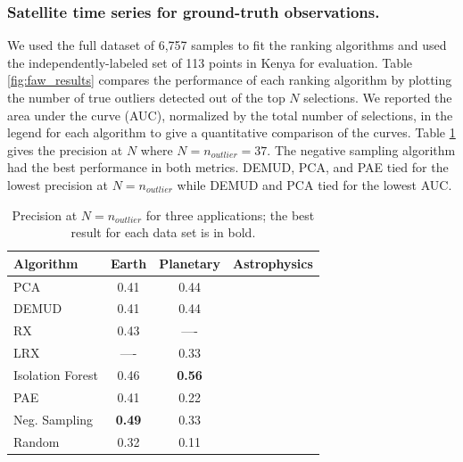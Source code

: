\documentclass[letterpaper]{article} %
\begin{document}
\subsubsection{Satellite time series for ground-truth observations.}
We used the full dataset of 6,757 samples to fit the ranking algorithms and
used the independently-labeled set of 113 points in Kenya for evaluation.
Table \ref{fig:faw_results} compares the performance of each ranking 
algorithm by plotting the number of true outliers detected out of the top
$N$ selections. We reported the area under the curve (AUC), normalized
by the total number of selections, in the legend
for each algorithm to give a quantitative comparison of the curves.
Table \ref{tab:faw_results} gives the precision at $N$ where
$N=n_{outlier}=37$. The negative sampling algorithm had the best performance
in both metrics. DEMUD, PCA, and PAE tied for the lowest precision at 
$N=n_{outlier}$ while DEMUD and PCA tied for the lowest AUC.

\begin{table}
  \caption{Precision at $N=n_{outlier}$ for three applications; the
  best result for each data set is in bold.}
  \label{tab:faw_results}
  \centering
  \begin{tabular}{l|ccc}
    \hline
    Algorithm & Earth & Planetary & Astrophysics \\
    \hline
    PCA               & 0.41 & 0.44 \\
    DEMUD             & 0.41 & 0.44 \\
    \hline
    RX                & 0.43 & ---- \\
    LRX               & ---- & 0.33 \\
    \hline
    Isolation Forest  & 0.46 & \textbf{0.56} \\
    \hline
    PAE               & 0.41 & 0.22 \\
    Neg. Sampling & \textbf{0.49} & 0.33 \\
    \hline
    Random            & 0.32 & 0.11 \\
    \hline
  \end{tabular}
\end{table}
\end{document}
